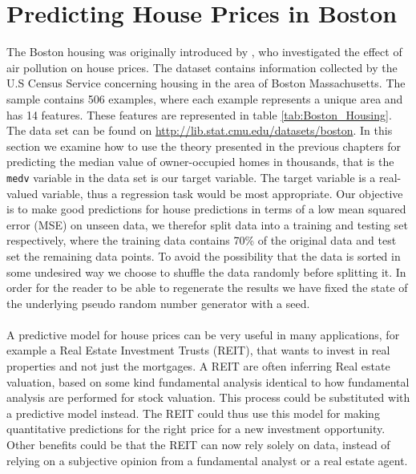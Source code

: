 \section{Predicting House Prices in Boston} \label{sec:Boston_housing}
The Boston housing was originally introduced by \cite{HARRISON197881}, who investigated the effect of air pollution on house prices. 
The dataset contains information collected by the U.S Census Service concerning housing in the area of Boston Massachusetts. The sample contains 506 examples, where each example represents a unique area and has 14 features. These features are represented in table \ref{tab:Boston_Housing}. The data set can be found on \href{http://lib.stat.cmu.edu/datasets/boston}{http://lib.stat.cmu.edu/datasets/boston}. In this section we examine how to use the theory presented in the previous chapters for predicting the median value of owner-occupied homes in thousands, that is the \texttt{medv} variable in the data set is our target variable. The target variable is a real-valued variable, thus a regression task would be most appropriate.   
Our objective is to make good predictions for house predictions in terms of a low mean squared error (MSE) on unseen data, we therefor split data into a training and testing set respectively, where the training data contains 70\% of the original data and test set the remaining data points. To avoid the possibility that the data is sorted in some undesired way we choose to shuffle the data randomly before splitting it. In order for the reader to be able to regenerate the results we have fixed the state of the underlying pseudo random number generator with a seed. \\
\\
 A predictive model for house prices can be very useful in many applications, for example a Real Estate Investment Trusts (REIT), that wants to invest in real properties and not just the mortgages. A REIT are often inferring Real estate valuation, based on some kind fundamental analysis identical to how fundamental analysis are performed for stock valuation. This process could be substituted with a predictive model instead. The REIT could thus use this model for making quantitative predictions for the right price for a new investment opportunity. Other benefits could be that the REIT can now rely solely on data, instead of relying on a subjective opinion from a fundamental analyst or a real estate agent.   



